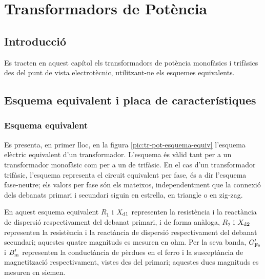 \chapter{Transformadors de Potència}\label{sec:ch-trafos-pot}

\section{Introducció}
Es tracten en aquest capítol els transformadors de potència
monofàsics i trifàsics des del punt de vista electrotècnic, utilitzant-ne els esquemes equivalents.

\section{Esquema equivalent i placa de característiques}

\subsection{Esquema equivalent}

Es presenta, en primer lloc, en la figura \vref{pic:tr-pot-esquema-equiv} l'esquema elèctric equivalent d'un transformador.
L'esquema és vàlid tant per a un transformador monofàsic com per a un de trifàsic. En el cas d'un transformador trifàsic, l'esquema representa el circuit equivalent per fase, és a dir l'esquema fase-neutre; els valors per fase són els mateixos, independentment que la connexió dels debanats primari i secundari siguin en estrella, en triangle o en zig-zag.

\begin{center}
    
    \label{pic:tr-pot-esquema-equiv}
\end{center}

En aquest esquema equivalent $R_1$ i $X_\mathrm{d1}$ representen la resistència i la reactància de dispersió respectivament del debanat primari, i de forma anàloga, $R_2$ i $X_\mathrm{d2}$ representen la resistència i la reactància de dispersió respectivament del debanat secundari; aquestes quatre magnituds es mesuren en ohm. Per la seva banda, $G_\mathrm{Fe}'$ i $B_\mathrm{m}'$ representen la conductància de pèrdues en el ferro i la susceptància de magnetització respectivament, vistes des del primari; aquestes dues magnituds es mesuren en siemen.

